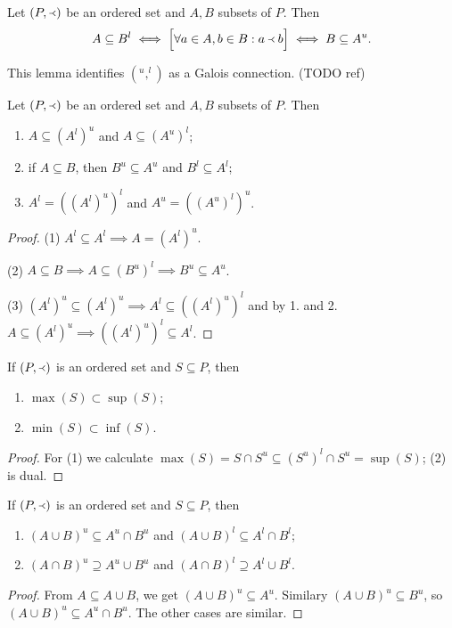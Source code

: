 \begin{lemma}
Let $(P,\Yleft)$ be an ordered set and $A,B$ subsets of $P$. Then
\[ A\subseteq B^l \iff \Big[\forall a\in A, b\in B: a\Yleft b \Big] \iff B\subseteq A^u. \]
\end{lemma}
This lemma identifies $(^u,^l)$ as a Galois connection. (TODO ref)
\begin{corollary}
Let $(P,\Yleft)$ be an ordered set and $A,B$ subsets of $P$. Then
\begin{enumerate}
\item $A\subseteq (A^l)^u$ and $A\subseteq (A^u)^l$;
\item if $A\subseteq B$, then $B^u\subseteq A^u$ and $B^l \subseteq A^l$;
\item $A^l = ((A^l)^u)^l$ and $A^u = ((A^u)^l)^u$.
\end{enumerate}
\end{corollary}
\begin{proof}
(1) $A^l \subseteq A^l \implies A = (A^l)^u$.

(2) $A\subseteq B \implies A \subseteq (B^u)^l \implies B^u\subseteq A^u$.

(3) $(A^l)^u \subseteq (A^l)^u \implies A^l \subseteq ((A^l)^u)^l$ and by 1. and 2. $A\subseteq (A^l)^u \implies ((A^l)^u)^l \subseteq A^l$.
\end{proof}
\begin{corollary} \label{maxSupMinInf}
If $\left( P, \Yleft \right)$ is an ordered set and $S\subseteq P$, then
\begin{enumerate}
\item $\max(S)\subset \sup(S)$;
\item $\min(S)\subset \inf(S)$.
\end{enumerate}
\end{corollary}
\begin{proof}
For (1) we calculate $\max(S) = S \cap S^u \subseteq (S^u)^l \cap S^u = \sup(S)$; (2) is dual.
\end{proof}
\begin{corollary}
If $\left( P, \Yleft \right)$ is an ordered set and $S\subseteq P$, then
\begin{enumerate}
\item $(A\cup B)^u \subseteq A^u\cap B^u$ and $(A\cup B)^l \subseteq A^l\cap B^l$;
\item $(A\cap B)^u \supseteq A^u\cup B^u$ and $(A\cap B)^l \supseteq A^l\cup B^l$.
\end{enumerate}
\end{corollary}
\begin{proof}
From $A\subseteq A\cup B$, we get $(A\cup B)^u \subseteq A^u$. Similary $(A\cup B)^u \subseteq B^u$, so $(A\cup B)^u \subseteq A^u\cap B^u$. The other cases are similar.
\end{proof}

